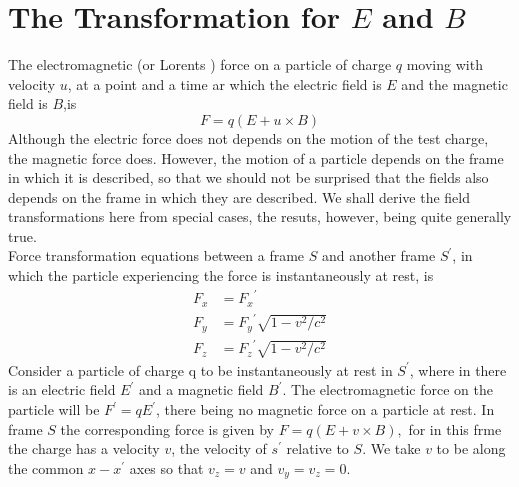 \section{The Transformation for $E$ and $B$}
The electromagnetic (or Lorents ) force on a particle of charge $q$ moving with velocity $u$, at a point and a time ar which the electric field is $E$ and the magnetic field is $B$,is  
$$F=q(E+u\times B)$$
Although the electric force does not depends on the motion of the test charge, the magnetic force does. However, the motion of a particle depends on the frame in which it is described, so that we should not be surprised that the fields also depends on the frame in which they are described. We shall derive the field transformations here from special cases, the resuts, however, being quite generally true. \\
Force transformation equations between a frame $S$ and another frame $S^\prime$, in which the particle experiencing the force is instantaneously at rest, is
	\begin{align*}
	F_x&={F_x}^{\prime}\\
	F_y&={F_y}^{\prime}\sqrt{1-v^{2} / c^{2}}\\
	F_z&={F_z}^{\prime}\sqrt{1-v^{2} / c^{2}}
	\end{align*}
Consider a particle of charge q to be instantaneously at rest in $S^\prime$, where in there is an electric field $E^\prime$ and a magnetic field $B^\prime$. The electromagnetic force on the particle will be $F^\prime=qE^\prime$, there being no magnetic force on a particle at rest. In frame $S$ the corresponding force is given by $F=q(E+v\times B),$ for in this frme the charge has a velocity $v$, the velocity of $s^\prime$ relative to $S$. We take $v$ to be along the common $x-x^\prime$ axes so that $v_z=v$ and $v_y=v_z=0.$